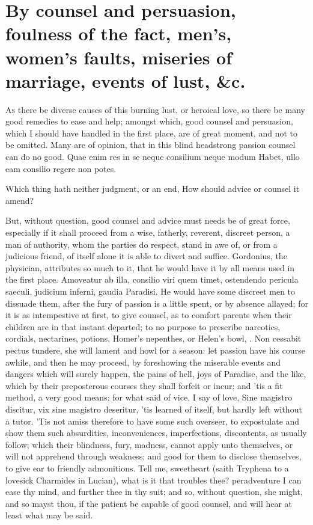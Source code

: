 \section[Counsel and persuasion]{By counsel and persuasion, foulness of the fact, men's, women's faults, miseries of marriage, events of lust, \&c.}

\lettrine{A}{s} there be diverse causes of this burning lust, or heroical love, so
there be many good remedies to ease and help; amongst which, good
counsel and persuasion, which I should have handled in the first place,
are of great moment, and not to be omitted. Many are of opinion, that
in this blind headstrong passion counsel can do no good.
Quae enim res in se neque consilium neque modum
Habet, ullo eam consilio regere non potes.

Which thing hath neither judgment, or an end,
How should advice or counsel it amend?

 But, without question, good counsel
and advice must needs be of great force, especially if it shall proceed
from a wise, fatherly, reverent, discreet person, a man of authority,
whom the parties do respect, stand in awe of, or from a judicious
friend, of itself alone it is able to divert and suffice. Gordonius,
the physician, attributes so much to it, that he would have it by all
means used in the first place. Amoveatur ab illa, consilio viri quem
timet, ostendendo pericula saeculi, judicium inferni, gaudia Paradisi.
He would have some discreet men to dissuade them, after the fury of
passion is a little spent, or by absence allayed; for it is as
intempestive at first, to give counsel, as to comfort parents when
their children are in that instant departed; to no purpose to prescribe
narcotics, cordials, nectarines, potions, Homer's nepenthes, or Helen's
bowl, \etc{}. Non cessabit pectus tundere, she will lament and howl for a
season: let passion have his course awhile, and then he may proceed, by
foreshowing the miserable events and dangers which will surely happen,
the pains of hell, joys of Paradise, and the like, which by their
preposterous courses they shall forfeit or incur; and 'tis a fit
method, a very good means; for what \Seneca{} said of vice, I say of
love, Sine magistro discitur, vix sine magistro deseritur, 'tis learned
of itself, but hardly left without a tutor. 'Tis not amiss
therefore to have some such overseer, to expostulate and show them such
absurdities, inconveniences, imperfections, discontents, as usually
follow; which their blindness, fury, madness, cannot apply unto
themselves, or will not apprehend through weakness; and good for them
to disclose themselves, to give ear to friendly admonitions. Tell me,
sweetheart (saith Tryphena to a lovesick Charmides in Lucian),
what is it that troubles thee? peradventure I can ease thy mind, and
further thee in thy suit; and so, without question, she might, and so
mayst thou, if the patient be capable of good counsel, and will hear at
least what may be said.

